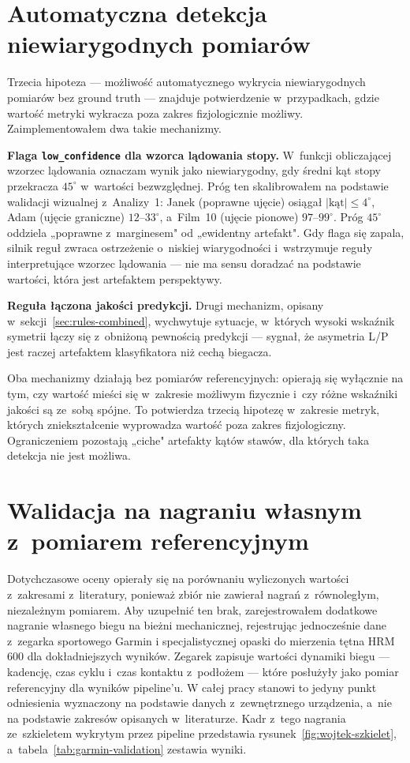 \section{Automatyczna detekcja niewiarygodnych pomiarów}
\label{sec:auto-detekcja}

Trzecia hipoteza --- możliwość automatycznego wykrycia niewiarygodnych pomiarów bez ground truth --- znajduje potwierdzenie w~przypadkach, gdzie wartość metryki wykracza poza zakres fizjologicznie możliwy. Zaimplementowałem dwa takie mechanizmy.

\textbf{Flaga \texttt{low\_confidence} dla wzorca lądowania stopy.} W~funkcji obliczającej wzorzec lądowania oznaczam wynik jako niewiarygodny, gdy średni kąt stopy przekracza $45^\circ$ w~wartości bezwzględnej. Próg ten skalibrowałem na podstawie walidacji wizualnej z~Analizy~1: Janek (poprawne ujęcie) osiągał $|\text{kąt}| \le 4^\circ$, Adam (ujęcie graniczne) $12$--$33^\circ$, a~Film~10 (ujęcie pionowe) $97$--$99^\circ$. Próg $45^\circ$ oddziela „poprawne z~marginesem" od „ewidentny artefakt". Gdy flaga się zapala, silnik reguł zwraca ostrzeżenie o~niskiej wiarygodności i~wstrzymuje reguły interpretujące wzorzec lądowania --- nie ma sensu doradzać na podstawie wartości, która jest artefaktem perspektywy.

\textbf{Reguła łączona jakości predykcji.} Drugi mechanizm, opisany w~sekcji~\ref{sec:rules-combined}, wychwytuje sytuacje, w~których wysoki wskaźnik symetrii łączy się z~obniżoną pewnością predykcji --- sygnał, że asymetria L/P jest raczej artefaktem klasyfikatora niż cechą biegacza.

Oba mechanizmy działają bez pomiarów referencyjnych: opierają się wyłącznie na tym, czy wartość mieści się w~zakresie możliwym fizycznie i~czy różne wskaźniki jakości są ze~sobą spójne. To potwierdza trzecią hipotezę w~zakresie metryk, których zniekształcenie wyprowadza wartość poza zakres fizjologiczny. Ograniczeniem pozostają „ciche" artefakty kątów stawów, dla których taka detekcja nie jest możliwa.

\section{Walidacja na nagraniu własnym z~pomiarem referencyjnym}
\label{sec:walidacja-garmin}

Dotychczasowe oceny opierały się na porównaniu wyliczonych wartości z~zakresami z~literatury, ponieważ zbiór nie zawierał nagrań z~równoległym, niezależnym pomiarem. Aby uzupełnić ten brak, zarejestrowałem dodatkowe nagranie własnego biegu na bieżni mechanicznej, rejestrując jednocześnie dane z~zegarka sportowego Garmin i specjalistycznej opaski do mierzenia tętna HRM 600 dla dokładniejszych wyników. Zegarek zapisuje wartości dynamiki biegu --- kadencję, czas cyklu i~czas kontaktu z~podłożem --- które posłużyły jako pomiar referencyjny dla wyników pipeline'u. W całej pracy stanowi to jedyny punkt odniesienia wyznaczony na podstawie danych z~zewnętrznego urządzenia, a~nie na podstawie zakresów opisanych w~literaturze.  Kadr z~tego nagrania ze~szkieletem wykrytym przez pipeline przedstawia rysunek~\ref{fig:wojtek-szkielet}, a~tabela~\ref{tab:garmin-validation} zestawia wyniki.

